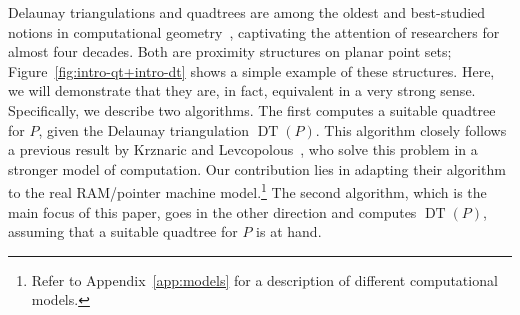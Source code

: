 \documentclass[11pt]{paper}
\DeclareMathOperator {\DT}{DT}
\begin{document}
  Delaunay triangulations and quadtrees are among the oldest and
  best-studied notions in computational
  geometry~\cite{deBergChvKrOv08,BoissonnatYv98,d-slsv-34,FinkelBe74,m-pdt-97,Samet90,ShamosHo75,PreparataSh85}, captivating the attention of researchers
  for almost four decades. 
  Both are proximity structures on planar point sets;
  Figure~\ref {fig:intro-qt+intro-dt} shows a simple example of these structures.
  Here, we will demonstrate that
  they are, in fact, equivalent in a very strong sense.
Specifically, we describe two algorithms. The first computes a suitable 
  quadtree for $P$, given the Delaunay triangulation $\DT(P)$. 
  This algorithm closely follows
  a previous result by Krznaric and
  Levcopolous~\cite{KrznaricLe98}, who solve this problem in a stronger
  model of computation. Our contribution lies in adapting
  their algorithm to the real RAM/pointer machine model.\footnote{Refer
  to Appendix~\ref{app:models} for a description of different computational
  models.}
  The second algorithm, which is the main focus of this paper,
  goes in the other direction and computes
  $\DT(P)$, assuming that a suitable quadtree for $P$ is at hand.
  
\end{document}
